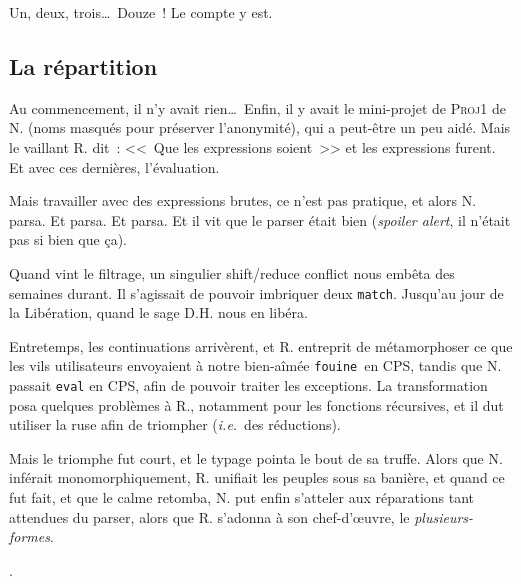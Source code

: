 \documentclass[a4, 12pt, titlepage]{scrartcl}
\newcommand{\ie}[0]{\textit{i.e.}}
\newcommand{\fouine}[0]{\texttt{fouine}}
\begin{document}
Un, deux, trois\ldots\ Douze~! Le compte y est.

\subsection{La répartition}\label{subsec:22}

Au commencement, il n'y avait rien\ldots\ Enfin, il y avait le
mini-projet de \textsc{Proj1} de N. (noms masqués pour préserver
l'anonymité), qui a peut-être un peu aidé. Mais le vaillant R. dit~:
<<~Que les expressions soient~>> et les expressions furent. Et avec
ces dernières, l'évaluation.

Mais travailler avec des expressions brutes, ce n'est pas pratique, et
alors N. parsa. Et parsa. Et parsa. Et il vit que le parser était bien
(\emph{spoiler alert}, il n'était pas si bien que ça).

Quand vint le filtrage, un singulier shift/reduce conflict nous
embêta des semaines durant. Il s'agissait de pouvoir imbriquer deux
\texttt{match}. Jusqu'au jour de la Libération, quand le
sage D.H. nous en libéra.

Entretemps, les continuations arrivèrent, et R. entreprit de
métamorphoser ce que les vils utilisateurs envoyaient à notre
bien-aîmée \fouine\ en CPS, tandis que N. passait \texttt{eval} en
CPS, afin de pouvoir traiter les exceptions. La transformation posa
quelques problèmes à R., notamment pour les fonctions récursives, et
il dut utiliser la ruse afin de triompher (\ie\ des réductions).

Mais le triomphe fut court, et le typage pointa le bout de sa
truffe. Alors que N. inférait monomorphiquement, R. unifiait les
peuples sous sa banière, et quand ce fut fait, et que le calme
retomba, N. put enfin s'atteler aux réparations tant attendues du
parser, alors que R. s'adonna à son chef-d'œuvre, le \emph{plusieurs-formes}.

\cite{Landin66}.



~\cite{Tchana21}




\end{document}
